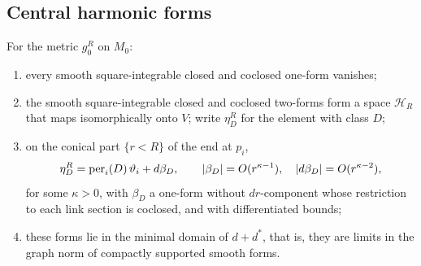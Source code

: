 \subsection{Central harmonic forms}
\begin{lemma}\label{lem:central-kernels}
For the metric $g_0^R$ on $M_0$:
\begin{enumerate}
\item every smooth square-integrable closed and coclosed one-form
vanishes;
\item the smooth square-integrable closed and coclosed two-forms form a
space $\mathcal H_R$ that maps isomorphically onto $V$; write
$\eta^R_D$ for the element with class $D$;
\item on the conical part $\{r<R\}$ of the end at $p_i$,
\begin{equation}\label{eq:cone-expansion}
 \eta^R_D=\operatorname{per}_i(D)\,\vartheta_i+d\beta_{D},\qquad
 |\beta_D|=O(r^{\kappa-1}),\quad|d\beta_D|=O(r^{\kappa-2}),
\end{equation}
for some $\kappa>0$, with $\beta_D$ a one-form without $dr$-component whose
restriction to each link section is coclosed, and with differentiated
bounds;
\item these forms lie in the minimal domain of $d+d^*$, that is, they are
limits in the graph norm of compactly supported smooth forms.
\end{enumerate}
\end{lemma}
